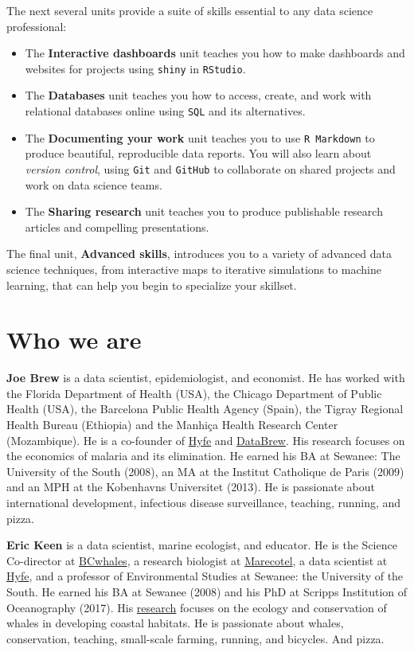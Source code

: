 \documentclass[
]{book}
\begin{document}
The next several units provide a suite of skills essential to any data science professional:

\begin{itemize}
\item
  The \textbf{Interactive dashboards} unit teaches you how to make dashboards and websites for projects using \texttt{shiny} in \texttt{RStudio}.
\item
  The \textbf{Databases} unit teaches you how to access, create, and work with relational databases online using \texttt{SQL} and its alternatives.
\item
  The \textbf{Documenting your work} unit teaches you to use \texttt{R\ Markdown} to produce beautiful, reproducible data reports. You will also learn about \emph{version control}, using \texttt{Git} and \texttt{GitHub} to collaborate on shared projects and work on data science teams.
\item
  The \textbf{Sharing research} unit teaches you to produce publishable research articles and compelling presentations.
\end{itemize}

The final unit, \textbf{Advanced skills}, introduces you to a variety of advanced data science techniques, from interactive maps to iterative simulations to machine learning, that can help you begin to specialize your skillset.

\hypertarget{who-we-are}{%
\section*{Who we are}\label{who-we-are}}

\textbf{Joe Brew} is a data scientist, epidemiologist, and economist. He has worked with the Florida Department of Health (USA), the Chicago Department of Public Health (USA), the Barcelona Public Health Agency (Spain), the Tigray Regional Health Bureau (Ethiopia) and the Manhiça Health Research Center (Mozambique). He is a co-founder of \href{www.hyfe.ai}{Hyfe} and \href{www.databrew.cc}{DataBrew}. His research focuses on the economics of malaria and its elimination. He earned his BA at Sewanee: The University of the South (2008), an MA at the Institut Catholique de Paris (2009) and an MPH at the Kobenhavns Universitet (2013). He is passionate about international development, infectious disease surveillance, teaching, running, and pizza.

\textbf{Eric Keen} is a data scientist, marine ecologist, and educator. He is the Science Co-director at \href{www.bcwhales.org}{BCwhales}, a research biologist at \href{www.marecotel.org}{Marecotel}, a data scientist at \href{www.hyfe.ai}{Hyfe}, and a professor of Environmental Studies at Sewanee: the University of the South. He earned his BA at Sewanee (2008) and his PhD at Scripps Institution of Oceanography (2017). His \href{https://scholar.google.com/citations?hl=en\&user=SrLDYrEAAAAJ\&view_op=list_works\&sortby=pubdate}{research} focuses on the ecology and conservation of whales in developing coastal habitats. He is passionate about whales, conservation, teaching, small-scale farming, running, and bicycles. And pizza.
\end{document}
